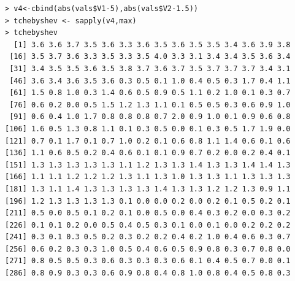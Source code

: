 \documentclass[fontsize=10pt]{scrartcl}
\begin{document}
\begin{enumerate}
\begin{enumerate}
\begin{verbatim}
> v4<-cbind(abs(vals$V1-5),abs(vals$V2-1.5))
> tchebyshev <- sapply(v4,max)
> tchebyshev
  [1] 3.6 3.6 3.7 3.5 3.6 3.3 3.6 3.5 3.6 3.5 3.5 3.4 3.6 3.9 3.8
 [16] 3.5 3.7 3.6 3.3 3.5 3.3 3.5 4.0 3.3 3.1 3.4 3.4 3.5 3.6 3.4
 [31] 3.4 3.5 3.5 3.6 3.5 3.8 3.7 3.6 3.7 3.5 3.7 3.7 3.7 3.4 3.1
 [46] 3.6 3.4 3.6 3.5 3.6 0.3 0.5 0.1 1.0 0.4 0.5 0.3 1.7 0.4 1.1
 [61] 1.5 0.8 1.0 0.3 1.4 0.6 0.5 0.9 0.5 1.1 0.2 1.0 0.1 0.3 0.7
 [76] 0.6 0.2 0.0 0.5 1.5 1.2 1.3 1.1 0.1 0.5 0.5 0.3 0.6 0.9 1.0
 [91] 0.6 0.4 1.0 1.7 0.8 0.8 0.8 0.7 2.0 0.9 1.0 0.1 0.9 0.6 0.8
[106] 1.6 0.5 1.3 0.8 1.1 0.1 0.3 0.5 0.0 0.1 0.3 0.5 1.7 1.9 0.0
[121] 0.7 0.1 1.7 0.1 0.7 1.0 0.2 0.1 0.6 0.8 1.1 1.4 0.6 0.1 0.6
[136] 1.1 0.6 0.5 0.2 0.4 0.6 0.1 0.1 0.9 0.7 0.2 0.0 0.2 0.4 0.1
[151] 1.3 1.3 1.3 1.3 1.3 1.1 1.2 1.3 1.3 1.4 1.3 1.3 1.4 1.4 1.3
[166] 1.1 1.1 1.2 1.2 1.2 1.3 1.1 1.3 1.0 1.3 1.3 1.1 1.3 1.3 1.3
[181] 1.3 1.1 1.4 1.3 1.3 1.3 1.3 1.4 1.3 1.3 1.2 1.2 1.3 0.9 1.1
[196] 1.2 1.3 1.3 1.3 1.3 0.1 0.0 0.0 0.2 0.0 0.2 0.1 0.5 0.2 0.1
[211] 0.5 0.0 0.5 0.1 0.2 0.1 0.0 0.5 0.0 0.4 0.3 0.2 0.0 0.3 0.2
[226] 0.1 0.1 0.2 0.0 0.5 0.4 0.5 0.3 0.1 0.0 0.1 0.0 0.2 0.2 0.2
[241] 0.3 0.1 0.3 0.5 0.2 0.3 0.2 0.2 0.4 0.2 1.0 0.4 0.6 0.3 0.7
[256] 0.6 0.2 0.3 0.3 1.0 0.5 0.4 0.6 0.5 0.9 0.8 0.3 0.7 0.8 0.0
[271] 0.8 0.5 0.5 0.3 0.6 0.3 0.3 0.3 0.6 0.1 0.4 0.5 0.7 0.0 0.1
[286] 0.8 0.9 0.3 0.3 0.6 0.9 0.8 0.4 0.8 1.0 0.8 0.4 0.5 0.8 0.3
\end{verbatim}
			\end{enumerate}
	\end{enumerate}
\end{document}
